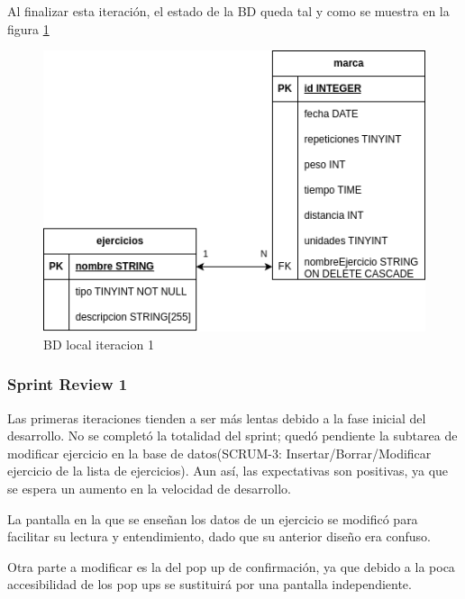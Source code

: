 Al finalizar esta iteración, el estado de la BD queda tal y como se muestra en la figura \cref{fig:BD local iteracion 1}
\begin{figure}[H]
   \centering
    \includegraphics[width=\textwidth]{fotos/BDL iteracion 1.png}
    \caption{BD local iteracion 1}
    \label{fig:BD local iteracion 1}
\end{figure}

\subsubsection{Sprint Review 1}
Las primeras iteraciones tienden a ser más lentas debido a la fase inicial del desarrollo. No se completó la totalidad del sprint; quedó pendiente la subtarea de modificar ejercicio en la base de datos(SCRUM-3: Insertar/Borrar/Modificar ejercicio de la lista de ejercicios). Aun así, las expectativas son positivas, ya que se espera un aumento en la velocidad de desarrollo.

La pantalla en la que se enseñan los datos de un ejercicio se modificó para facilitar su lectura y entendimiento, dado que su anterior diseño era confuso.

Otra parte a modificar es la del pop up de confirmación, ya que debido a la poca accesibilidad de los pop ups se sustituirá por una pantalla independiente.

